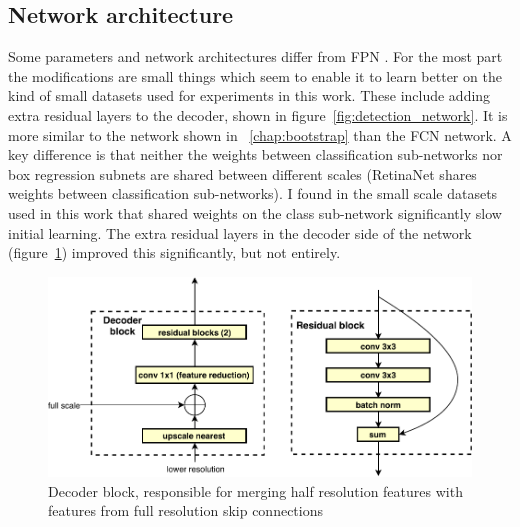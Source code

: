 \subsection {Network architecture}
\label{sec:architecture}

Some parameters and network architectures differ from \gls{FPN} \cite{Lin2017a}. For the most part the modifications are small things which seem to enable it to learn better on the kind of small datasets used for experiments in this work. These include adding extra residual layers to the decoder, shown in figure~\ref{fig:detection_network}. It is more similar to the network shown in ~\ref{chap:bootstrap} than the \gls{FCN} network. A key difference is that neither the weights between classification sub-networks nor box regression subnets are shared between different scales  (RetinaNet shares weights between classification sub-networks). I found in the small scale datasets used in this work that shared weights on the class sub-network significantly slow initial learning. The extra residual layers in the decoder side of the network (figure~\ref{fig:decoder_block}) improved this significantly, but not entirely. 

\begin{figure}[h]
  \centering
  \includegraphics[width=1.0\linewidth]{figures/annotation/decoder_block.pdf}
  \caption{Decoder block, responsible for merging half resolution features with features from full resolution skip connections }  
  \label{fig:decoder_block}
\end{figure}


